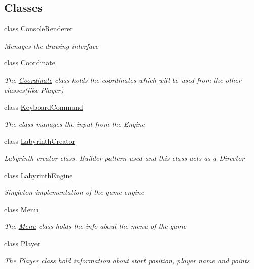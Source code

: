 \subsection*{Classes}
\begin{DoxyCompactItemize}
\item 
class \hyperlink{class_labyrinth_game_1_1_console_renderer}{Console\+Renderer}
\begin{DoxyCompactList}\small\item\em Menages the drawing interface \end{DoxyCompactList}\item 
class \hyperlink{class_labyrinth_game_1_1_coordinate}{Coordinate}
\begin{DoxyCompactList}\small\item\em The \hyperlink{class_labyrinth_game_1_1_coordinate}{Coordinate} class holds the coordinates which will be used from the other classes(like Player) \end{DoxyCompactList}\item 
class \hyperlink{class_labyrinth_game_1_1_keyboard_command}{Keyboard\+Command}
\begin{DoxyCompactList}\small\item\em The class manages the input from the Engine \end{DoxyCompactList}\item 
class \hyperlink{class_labyrinth_game_1_1_labyrinth_creator}{Labyrinth\+Creator}
\begin{DoxyCompactList}\small\item\em Labyrinth creator class. Builder pattern used and this class acts as a Director \end{DoxyCompactList}\item 
class \hyperlink{class_labyrinth_game_1_1_labyrinth_engine}{Labyrinth\+Engine}
\begin{DoxyCompactList}\small\item\em Singleton implementation of the game engine \end{DoxyCompactList}\item 
class \hyperlink{class_labyrinth_game_1_1_menu}{Menu}
\begin{DoxyCompactList}\small\item\em The \hyperlink{class_labyrinth_game_1_1_menu}{Menu} class holds the info about the menu of the game \end{DoxyCompactList}\item 
class \hyperlink{class_labyrinth_game_1_1_player}{Player}
\begin{DoxyCompactList}\small\item\em The \hyperlink{class_labyrinth_game_1_1_player}{Player} class hold information about start position, player name and points \end{DoxyCompactList}\item 

\end{DoxyCompactItemize}
